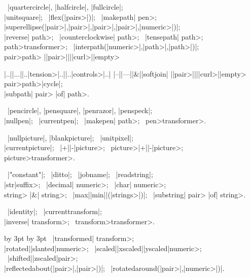 \medbreak\textindent{} \
|quartercircle|, |halfcircle|, |fullcircle|;\\
|unitsquare|; \
|flex(|\<pairs>|)|; \
|makepath| \<pen>;\\
|superellipse(|\<pair>|,|\<pair>|,|\<pair>|,|\<pair>|,|\<numeric>|)|;\\
|reverse| \<path>; \
|counterclockwise| \<path>; \
|tensepath| \<path>;\\
\<path>\<transformer>; \
|interpath(|\<numeric>|,|\<path>|,|\<path>|)|;\\
\bb\<pair>\cr\<path>\ee
\bb|{|\<pair>|}|\cr|{|\<curl>|}|\cr\<empty>\ee
\bb\strut|..|\cr|...|\cr|..|\<tension>|..|\cr|..|\<controls>|..|\cr
 |--|\cr|---|\cr|&|\cr|softjoin|\ee
\bb|{|\<pair>|}|\cr|{|\<curl>|}|\cr\<empty>\ee
\bb\<pair>\cr\<path>\cr|cycle|\ee;\\
|subpath| \<pair> |of| \<path>.

\medbreak\textindent\bull {\it ^{Pen} things:\/} \
|pencircle|, |pensquare|, |penrazor|, |penspeck|;\\
|nullpen|; \ |currentpen|; \
|makepen| \<path>; \
\<pen>\<transformer>.

\medbreak\textindent{} \
|nullpicture|, |blankpicture|; \ |unitpixel|;\\
|currentpicture|; \
\bb|+|\cr|-|\ee\<picture>; \
\<picture>\bb|+|\cr|-|\ee\<picture>;\\
\<picture>\<transformer>.

\medbreak\textindent\bull {\it ^{String} things:\/} \
|"constant"|; \ |ditto|; \ |jobname|; \ |readstring|;\\
|str|\<suffix>; \
|decimal| \<numeric>; \
|char| \<numeric>;\\
\<string> |&| \<string>; \
\bb|max|\cr|min|\ee|(|\<strings>|)|; \
|substring| \<pair> |of| \<string>.

\medbreak\textindent{} \
|identity|; \ |currenttransform|;\\
|inverse| \<transform>; \
\<transform>\<transformer>.

\advance\lineskip by 3pt
\advance\medskipamount by 3pt
\medbreak\textindent{} \
|transformed| \<transform>;\\
\bb|rotated|\cr|slanted|\ee\<numeric>; \
\bb|scaled|\cr|xscaled|\cr|yscaled|\ee\<numeric>; \
\bb|shifted|\cr|zscaled|\ee\<pair>;\\
|reflectedabout(|\<pair>|,|\<pair>|)|; \
|rotatedaround(|\<pair>|,|\<numeric>|)|.

